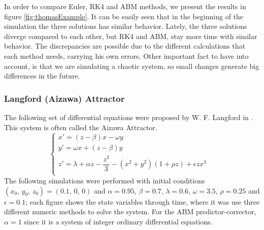 In order to compare Euler, RK4 and ABM methods, we present the results in figure \ref{fig:thomasExample}. It can be easily seen that in the beginning of the simulation the three solutions has similar behavior. Lately, the three solutions diverge compared to each other, but RK4 and ABM, stay more time with similar behavior. The discrepancies are possible due to the different calculations that each method needs, carrying his own errors. Other important fact to have into account, is that we are simulating a chaotic system, so small changes generate big differences in the future.


\subsubsection{Langford (Aizawa) Attractor}
The following set of differential equations were proposed by W. F. Langford in \cite{langford1984numerical}. This system is often called the Aizawa Attractor. 
\begin{equation}
    \begin{cases}
        x'=(z-\beta)x-\omega y&\\
        y'=\omega x+(z-\beta)y&\\
        z'=\lambda+\alpha z-\dfrac{z^3}{3}-(x^2+y^2)(1+\rho z)+\epsilon zx^3&\\
    \end{cases}
\end{equation}
The following simulations were performed with initial conditions $(x_0,\,y_0,\,z_0)=(0.1,\,0,\,0)$ and $\alpha=0.95$, $\beta=0.7$, $\lambda=0.6$, $\omega=3.5$, $\rho=0.25$ and $\epsilon=0.1$; each figure shows the state variables through time, where it was use three different numeric methods to solve the system. For the ABM predictor-corrector, $\alpha=1$ since it is a system of integer ordinary differential equations.
